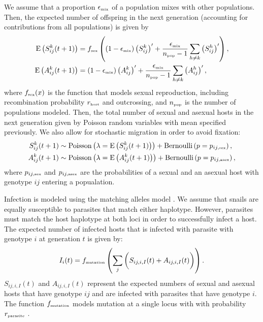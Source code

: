 \documentclass{article}\usepackage[]{graphicx}\usepackage[]{color}
\begin{document}
We assume that a proportion $\epsilon_{\textrm{\tiny mix}}$ of a population mixes with other populations.
Then, the expected number of offspring in the next generation (accounting for contributions from all populations) is given by
\begin{equation}
\begin{aligned}
\mathrm{E}\left(S_{ij}^k(t+1)\right) &= f_{\textrm{\tiny sex}}\left((1 - \epsilon_{\textrm{\tiny mix}}) \left(S_{ij}^k\right)' + \frac{\epsilon_{\textrm{\tiny mix}}}{n_{\textrm{\tiny pop}}-1} \sum_{h \neq k} \left(S_{ij}^h\right)'\right),\\
\mathrm{E}\left(A_{ij}^k(t+1)\right) &= (1 - \epsilon_{\textrm{\tiny mix}}) \left(A_{ij}^k\right)' + \frac{\epsilon_{\textrm{\tiny mix}}}{n_{\textrm{\tiny pop}}-1} \sum_{h \neq k} \left(A_{ij}^h\right)',\\
\end{aligned}
\end{equation}
where $f_{\textrm{\tiny sex}}(x)$ is the function that models sexual reproduction, including recombination probability $r_{\textrm{\tiny host}}$ and outcrossing, and $n_{\textrm{\tiny pop}}$ is the number of populations modeled.
Then, the total number of sexual and asexual hosts in the next generation given by Poisson random variables with mean specified previously. We also allow for stochastic migration in order to avoid fixation:
\begin{equation}
\begin{aligned}
S_{ij}^k(t+1) &\sim \mathrm{Poisson}\left(\lambda=\mathrm{E}\left(S_{ij}^k(t+1)\right)\right) + \mathrm{Bernoulli}\left(p=p_{ij,\textrm{\tiny sex}}\right),\\
A_{ij}^k(t+1) &\sim \mathrm{Poisson}\left(\lambda=\mathrm{E}\left(A_{ij}^k(t+1)\right)\right) + \mathrm{Bernoulli}\left(p=p_{ij, \textrm{\tiny asex}}\right),
\end{aligned}
\end{equation}
where $p_{ij,\textrm{\tiny sex}}$ and $p_{ij, \textrm{\tiny asex}}$ are the probabilities of a sexual and an asexual host with genotype $ij$ entering a popualation.

Infection is modeled using the matching alleles model \citep{otto1998evolution}.
We assume that snails are equally susceptible to parasites that match either haplotype.
However, parasites must match the host haplotype at both loci in order to successfully infect a host.
The expected number of infected hosts that is infected with parasite with genotype $i$ at generation $t$ is given by:
\begin{equation}
I_{i}(t) = f_{\textrm{\tiny mutation}} \left( \sum_{j}  \bigg( S_{ij,i,I}(t) + A_{ij,i,I}(t)\bigg)\right).
\end{equation}
$S_{ij,i,I}(t)$ and $A_{ij,i,I}(t)$ represent the expected numbers of sexual and asexual hosts that have genotype $ij$ and are infected with parasites that have genotype $i$.
The function $f_{\textrm{\tiny mutation}}$ models mutation at a single locus with with probability $r_{\textrm{\tiny parasite}}$ \citep{ashby2015diversity}.
\end{document}

